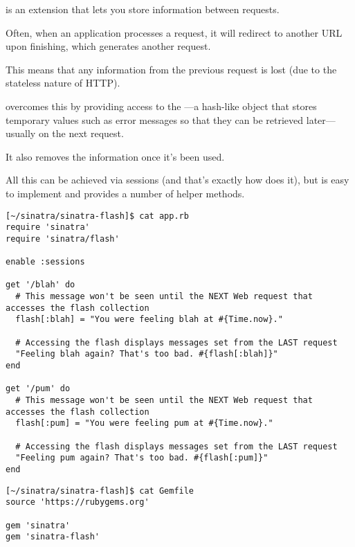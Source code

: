 is an extension that lets you store information between
requests. 

Often, when an application processes a request, it will redirect
to another URL upon finishing, which generates another request. 

This
means that any information from the previous request is lost (due to the
stateless nature of HTTP). 

overcomes this by providing
access to the —a hash-like object that stores temporary values
such as error messages so that they can be retrieved later—usually
on the next request. 

It also removes the information once it’s been
used. 

All this can be achieved via sessions (and that’s exactly how
does it), but 
is easy to implement and
provides a number of helper methods.

\begin{verbatim}
[~/sinatra/sinatra-flash]$ cat app.rb 
require 'sinatra'
require 'sinatra/flash'

enable :sessions

get '/blah' do
  # This message won't be seen until the NEXT Web request that accesses the flash collection
  flash[:blah] = "You were feeling blah at #{Time.now}."

  # Accessing the flash displays messages set from the LAST request
  "Feeling blah again? That's too bad. #{flash[:blah]}"
end

get '/pum' do
  # This message won't be seen until the NEXT Web request that accesses the flash collection
  flash[:pum] = "You were feeling pum at #{Time.now}."

  # Accessing the flash displays messages set from the LAST request
  "Feeling pum again? That's too bad. #{flash[:pum]}"
end
\end{verbatim}

\begin{verbatim}
[~/sinatra/sinatra-flash]$ cat Gemfile
source 'https://rubygems.org'

gem 'sinatra'
gem 'sinatra-flash'
\end{verbatim}
